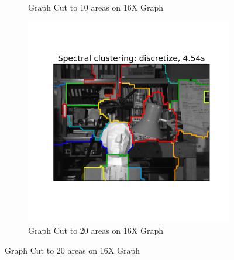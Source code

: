 \begin{figure}[h!]
\begin{subfigure}[h]{0.33\textwidth}
                \caption{Graph Cut to 10 areas on 16X Graph}
                \label{fig:graphcut_small4_10}
        \end{subfigure}
        \begin{subfigure}[h]{0.33\textwidth}
                \includegraphics[width=\textwidth]{fig/592_small4_20.png}
                \caption{Graph Cut to 20 areas on 16X Graph}
                \label{fig:graphcut_small4_20}
        \end{subfigure}
        

\end{figure}
